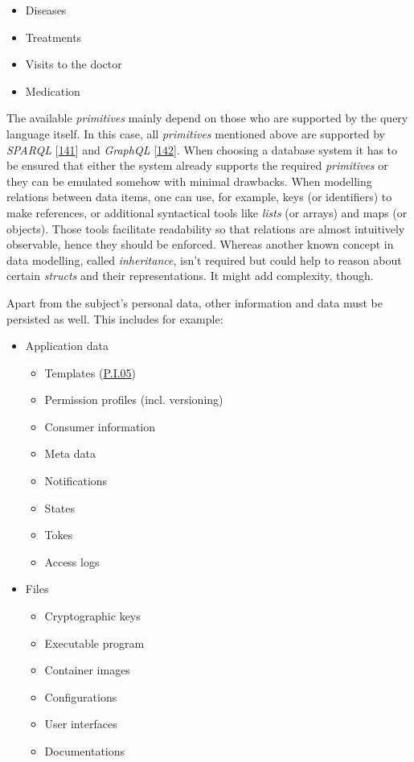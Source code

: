\documentclass[12pt,english,a4paper,titlepage,cleardoublepage=empty,dottedtoc]{report}
\providecommand{\tightlist}{%
  \setlength{\itemsep}{0pt}\setlength{\parskip}{0pt}}
\begin{document}
\begin{itemize}
  \begin{itemize}
  \tightlist
  \item
    Diseases
  \item
    Treatments
  \item
    Visits to the doctor
  \item
    Medication
  \end{itemize}
\end{itemize}

The available \emph{primitives} mainly depend on those who are supported
by the query language itself. In this case, all \emph{primitives}
mentioned above are supported by \emph{SPARQL}
{[}\protect\hyperlink{ref-web_spec_xml_types}{141}{]} and \emph{GraphQL}
{[}\protect\hyperlink{ref-web_spec_graphql_types}{142}{]}. When choosing
a database system it has to be ensured that either the system already
supports the required \emph{primitives} or they can be emulated somehow
with minimal drawbacks. When modelling relations between data items, one
can use, for example, keys (or identifiers) to make references, or
additional syntactical tools like \emph{lists} (or arrays) and maps (or
objects). Those tools facilitate readability so that relations are
almost intuitively observable, hence they should be enforced. Whereas
another known concept in data modelling, called \emph{inheritance},
isn't required but could help to reason about certain \emph{structs} and
their representations. It might add complexity, though.

Apart from the subject's personal data, other information and data must
be persisted as well. This includes for example:

\begin{itemize}
\tightlist
\item
  Application data

  \begin{itemize}
  \tightlist
  \item
    Templates (\protect\hyperlink{pi05}{P.I.05})
  \item
    Permission profiles (incl. versioning)
  \item
    Consumer information
  \item
    Meta data
  \item
    Notifications
  \item
    States
  \item
    Tokes
  \item
    Access logs
  \end{itemize}
\item
  Files

  \begin{itemize}
  \tightlist
  \item
    Cryptographic keys
  \item
    Executable program
  \item
    Container images
  \item
    Configurations
  \item
    User interfaces
  \item
    Documentations
  \end{itemize}
\end{itemize}
\end{document}
